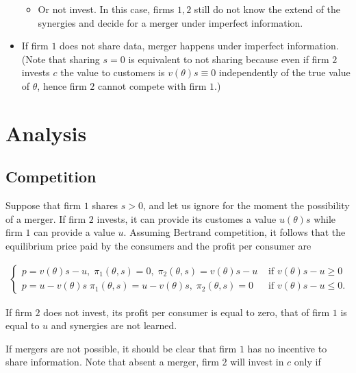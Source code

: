 \documentclass[a4paper,leqno]{article}%
\renewcommand{\t}{\theta}
\begin{document}
\begin{itemize}
\begin{itemize}
        \item Or not invest. In this case, firms $1,2$ still do not know the extend of the synergies and decide for a merger under imperfect information.

    \end{itemize}

    \item If firm $1$ does not share data, merger happens under imperfect information. (Note that sharing $s=0$ is equivalent to not sharing because even if firm $2$ invests $c$ the value to customers is $v(\t)s\equiv 0$ independently of the true value of $\t$, hence firm $2$ cannot compete with firm $1$.)

\end{itemize}





\section{Analysis}

\subsection{Competition}

Suppose that firm $1$ shares $s>0$, and let us ignore for the moment the possibility of a merger. If firm $2$ invests, it can provide its customes a value $u(\t)s$ while firm $1$ can provide a value $u$. Assuming Bertrand competition, it follows that the equilibrium price paid by the consumers and the profit per consumer are

\begin{align}\label{comp}
\begin{cases}
    p=v(\t)s-u,\; \pi_1(\t,s)=0,\; \pi_2(\t,s)=v(\t)s-u & \text{ if }v(\t)s-u\geq 0\\ 
    p=u-v(\t)s\; \pi_1(\t,s)=u-v(\t)s,\; \pi_2(\t,s)=0 & \text{ if }v(\t)s-u\leq 0.
\end{cases}
\end{align}

If firm $2$ does not invest, its profit per consumer is equal to zero, that of firm $1$ is equal to $u$ and synergies are not learned.



If mergers are not possible, it should be clear that firm $1$ has no incentive to share information. Note that absent a merger, firm $2$ will invest in $c$ only if 
\end{document}
